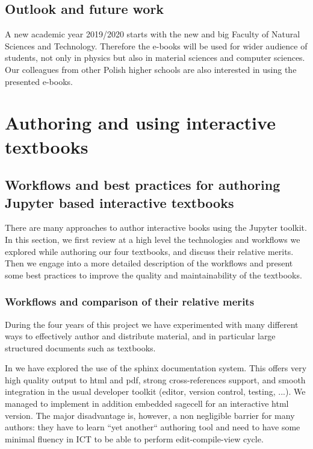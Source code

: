 \documentclass{deliverablereport}
\begin{document}
{{{\subsection{Outlook and future work}

A new academic year 2019/2020 starts with the new and big Faculty of
Natural Sciences and Technology. Therefore the e-books will be used
for wider audience of students, not only in physics but also in
material sciences and computer sciences. Our colleagues from other
Polish higher schools are also interested in using the presented
e-books.


\section{Authoring and using interactive textbooks}\label{sec:auth-using-inter}

\subsection{Workflows and best practices for authoring Jupyter based
  interactive textbooks}\label{sec:good-pract-softw}

There are many approaches to author interactive books using the
Jupyter toolkit. In this section, we first review at a high level the
technologies and workflows we explored while authoring our four
textbooks, and discuss their relative merits. Then we engage into a
more detailed description of the workflows and present some best
practices to improve the quality and maintainability of the textbooks.

\subsubsection{Workflows and comparison of their relative merits}

During the four years of this project we have experimented with many
different ways to effectively author and distribute material, and in
particular large structured documents such as textbooks.

In  we have explored the use of the
sphinx documentation system. This offers very high quality output to
html and pdf, strong cross-references support, and smooth integration
in the usual developer toolkit (editor, version control, testing,
...). We managed to implement in addition embedded sagecell for an
interactive html version. The major disadvantage is, however, a non
negligible barrier for many authors: they have to learn ``yet
another`` authoring tool and need to have some minimal fluency in ICT
to be able to perform edit-compile-view cycle.

}}}
\end{document}
